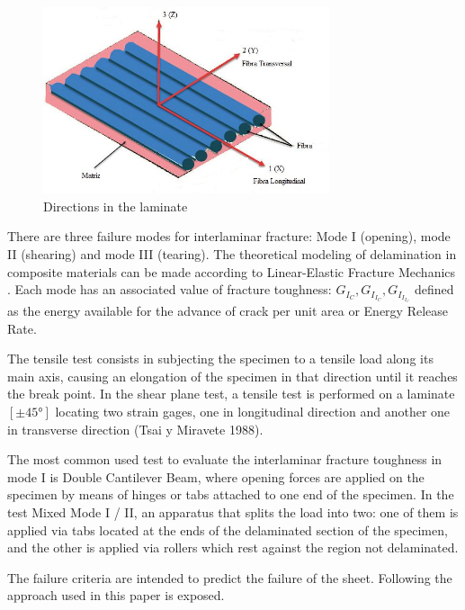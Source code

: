 \begin{figure}
  \includegraphics[width=0.75\textwidth]{direction}
\caption{Directions in the laminate}
\label{fig:dl}       %
\end{figure}

There are three failure modes for interlaminar fracture: Mode I (opening), mode II (shearing) and mode III (tearing). The theoretical modeling of delamination in composite materials can be made according to Linear-Elastic Fracture Mechanics . Each mode has an associated value of fracture toughness: $G_I_C, G_I_I_C, G_I_I_I_C$ defined as the energy available for the advance of crack per unit area or Energy Release Rate.

The tensile test consists in subjecting the specimen to a tensile load along its main axis, causing an elongation of the specimen in that direction until it reaches the break point. In the  shear plane test, a tensile test is performed on a laminate $[± 45 °]$ locating two strain gages, one in longitudinal direction and another one in transverse direction (Tsai y Miravete 1988).

The most common used test to evaluate the interlaminar fracture toughness in mode I is Double Cantilever Beam, where opening forces are applied on the specimen by means of hinges or tabs attached to one end of the specimen. In the test Mixed Mode I / II, an apparatus that splits the load into two: one of them is applied via tabs located at the ends of the delaminated section of the specimen, and the other is applied via rollers which rest against the region not delaminated. 

The failure criteria are intended to predict the failure of the sheet. Following the approach used in this paper is exposed. 


